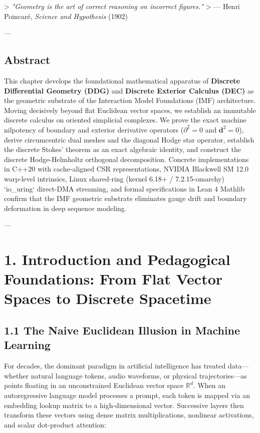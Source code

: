 \documentclass[11pt,twoside,openright]{amsbook}
\begin{document}
> \textit{"Geometry is the art of correct reasoning on incorrect figures."}  
> — Henri Poincaré, \textit{Science and Hypothesis} (1902)

---

\subsection{Abstract}
This chapter develops the foundational mathematical apparatus of \textbf{Discrete Differential Geometry (DDG)} and \textbf{Discrete Exterior Calculus (DEC)} as the geometric substrate of the Interaction Model Foundations (IMF) architecture. Moving decisively beyond flat Euclidean vector spaces, we establish an immutable discrete calculus on oriented simplicial complexes. We prove the exact machine nilpotency of boundary and exterior derivative operators ($\partial^2 = 0$ and $\mathbf{d}^2 = 0$), derive circumcentric dual meshes and the diagonal Hodge star operator, establish the discrete Stokes' theorem as an exact algebraic identity, and construct the discrete Hodge-Helmholtz orthogonal decomposition. Concrete implementations in C++20 with cache-aligned CSR representations, NVIDIA Blackwell SM 12.0 warp-level intrinsics, Linux shared-ring (kernel 6.18+ / 7.2.15-omarchy) `io_uring` direct-DMA streaming, and formal specifications in Lean 4 Mathlib confirm that the IMF geometric substrate eliminates gauge drift and boundary deformation in deep sequence modeling.

---

\section{1. Introduction and Pedagogical Foundations: From Flat Vector Spaces to Discrete Spacetime}

\subsection{1.1 The Naive Euclidean Illusion in Machine Learning}

For decades, the dominant paradigm in artificial intelligence has treated data—whether natural language tokens, audio waveforms, or physical trajectories—as points floating in an unconstrained Euclidean vector space $\mathbb{R}^d$. When an autoregressive language model processes a prompt, each token is mapped via an embedding lookup matrix to a high-dimensional vector. Successive layers then transform these vectors using dense matrix multiplications, nonlinear activations, and scalar dot-product attention:
\end{document}
